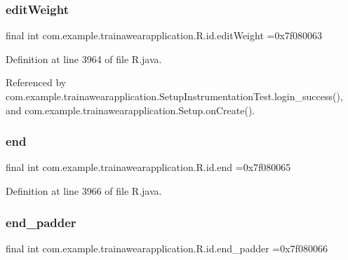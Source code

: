 \subsubsection{\texorpdfstring{editWeight}{editWeight}}
{\footnotesize\ttfamily final int com.\+example.\+trainawearapplication.\+R.\+id.\+edit\+Weight =0x7f080063\hspace{0.3cm}{\ttfamily [static]}}



Definition at line 3964 of file R.\+java.



Referenced by com.\+example.\+trainawearapplication.\+Setup\+Instrumentation\+Test.\+login\+\_\+success(), and com.\+example.\+trainawearapplication.\+Setup.\+on\+Create().

\mbox{\label{classcom_1_1example_1_1trainawearapplication_1_1_r_1_1id_ab29d061aa1220df65ffdaee55a2a8b92}} 
\subsubsection{\texorpdfstring{end}{end}}
{\footnotesize\ttfamily final int com.\+example.\+trainawearapplication.\+R.\+id.\+end =0x7f080065\hspace{0.3cm}{\ttfamily [static]}}



Definition at line 3966 of file R.\+java.

\mbox{\label{classcom_1_1example_1_1trainawearapplication_1_1_r_1_1id_a89bf5594a372c63a5df06eac2c019fab}} 
\subsubsection{\texorpdfstring{end\_padder}{end\_padder}}
{\footnotesize\ttfamily final int com.\+example.\+trainawearapplication.\+R.\+id.\+end\+\_\+padder =0x7f080066\hspace{0.3cm}{\ttfamily [static]}}



